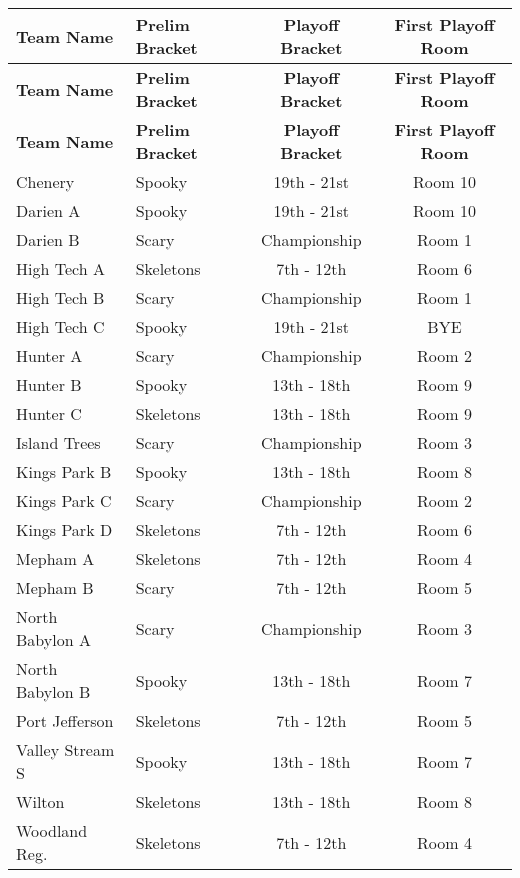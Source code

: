\documentclass{article}%
\begin{document}
\begin{longtable}{|l|lcc|}%
\rowcolor{gray!30}%
\hline%
\textbf{Team Name} &\textbf{Prelim Bracket}&\textbf{Playoff Bracket}&\textbf{First Playoff Room}\\%
\endhead%
\rowcolor{gray!25}%
\textbf{Team Name} &\textbf{Prelim Bracket}&\textbf{Playoff Bracket}&\textbf{First Playoff Room}\\%
\endfoot%
\hline\rowcolor{gray!25}%
\textbf{Team Name} &\textbf{Prelim Bracket}&\textbf{Playoff Bracket}&\textbf{First Playoff Room}\\%
\endlastfoot%
\hline%
Chenery&Spooky&19th {-} 21st&Room 10\\%
Darien A&Spooky&19th {-} 21st&Room 10\\%
Darien B&Scary&Championship&Room 1\\%
High Tech A&Skeletons&7th {-} 12th&Room 6\\%
High Tech B&Scary&Championship&Room 1\\%
High Tech C&Spooky&19th {-} 21st&BYE\\%
Hunter A&Scary&Championship&Room 2\\%
Hunter B&Spooky&13th {-} 18th&Room 9\\%
Hunter C&Skeletons&13th {-} 18th&Room 9\\%
Island Trees&Scary&Championship&Room 3\\%
Kings Park B&Spooky&13th {-} 18th&Room 8\\%
Kings Park C&Scary&Championship&Room 2\\%
Kings Park D&Skeletons&7th {-} 12th&Room 6\\%
Mepham A&Skeletons&7th {-} 12th&Room 4\\%
Mepham B&Scary&7th {-} 12th&Room 5\\%
North Babylon A&Scary&Championship&Room 3\\%
North Babylon B&Spooky&13th {-} 18th&Room 7\\%
Port Jefferson&Skeletons&7th {-} 12th&Room 5\\%
Valley Stream S&Spooky&13th {-} 18th&Room 7\\%
Wilton&Skeletons&13th {-} 18th&Room 8\\%
Woodland Reg.&Skeletons&7th {-} 12th&Room 4\\%
\hline%
\end{longtable}%
\end{document}
